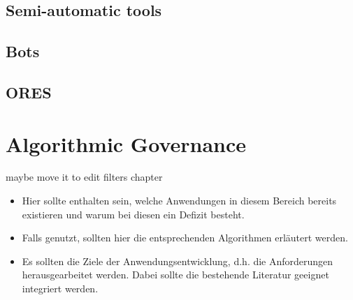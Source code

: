\subsection{Semi-automatic tools}
\subsection{Bots}
\subsection{ORES}


\section{Algorithmic Governance}

maybe move it to edit filters chapter

\begin{itemize}
    \item Hier sollte enthalten sein, welche Anwendungen in diesem Bereich bereits existieren und warum bei diesen ein Defizit besteht.
    \item Falls genutzt, sollten hier die entsprechenden Algorithmen erläutert werden.
    \item Es sollten die Ziele der Anwendungsentwicklung, d.h. die Anforderungen herausgearbeitet werden. Dabei sollte die bestehende Literatur geeignet integriert werden.
\end{itemize}
